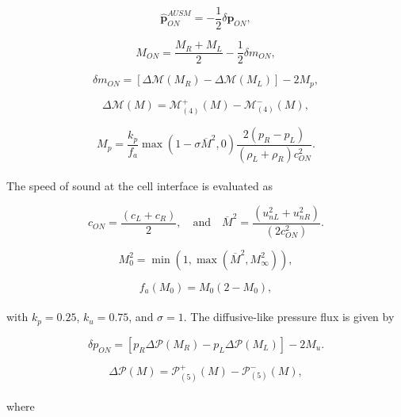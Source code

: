 \documentclass[a5paper]{sapthesis}
\begin{document}
	\begin{equation}
		\mathbf{\hat{p}}_{ON}^{AUSM} = -\frac{1}{2} \delta \mathbf{p}_{ON},
	\end{equation}
	
	\begin{equation}
		M_{ON} = \frac{M_R + M_L}{2} - \frac{1}{2} \delta m_{ON},
	\end{equation}
	
	\begin{equation}
		\delta m_{ON} = \left[ \Delta \mathcal{M}(M_R) - \Delta \mathcal{M}(M_L) \right] - 2M_p,
	\end{equation}
	
	\begin{equation}
		\Delta \mathcal{M}(M) = \mathcal{M}_{(4)}^+ (M) - \mathcal{M}_{(4)}^- (M),
	\end{equation}
	
	\begin{equation}
		M_p = \frac{k_p}{f_a} \max \left( 1 - \sigma \overline{M}^2, 0 \right) \frac{2(p_R - p_L)}{(\rho_L + \rho_R) c_{ON}^2}.
	\end{equation}
	\\
	The speed of sound at the cell interface is evaluated as 
	
	\begin{equation}
		c_{ON} = \frac{(c_L + c_R)}{2}, \quad \text{and} \quad \overline{M}^2 = \frac{(u_{nL}^2 + u_{nR}^2)}{(2c_{ON}^2)}.
	\end{equation}
	
	\begin{equation}
		M_0^2 = \min(1, \max(\overline{M}^2, M_{\infty}^2)),
	\end{equation}
	
	\begin{equation}
		f_a (M_0) = M_0 (2 - M_0),
	\end{equation}
	\\
	with \( k_p = 0.25 \), \( k_u = 0.75 \), and \( \sigma = 1 \).
	The diffusive-like pressure flux is given by
	
	\begin{equation}
		\delta p_{ON} = \left[ p_R \Delta \mathcal{P}(M_R) - p_L \Delta \mathcal{P}(M_L) \right] - 2M_u.
	\end{equation}
	
	\begin{equation}
		\Delta \mathcal{P}(M) = \mathcal{P}_{(5)}^+ (M) - \mathcal{P}_{(5)}^- (M),
	\end{equation}
	\\
	where
	
\end{document}
